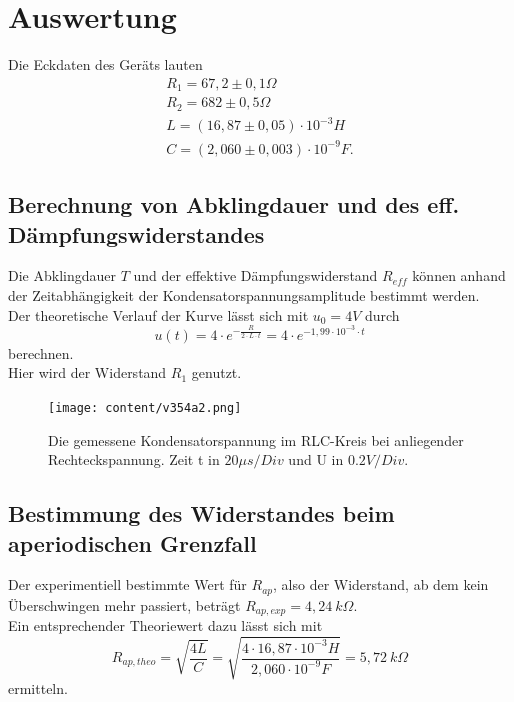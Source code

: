 \section{Auswertung}
\label{sec:Auswertung}

Die Eckdaten des Geräts lauten 
\begin{align*}
  R_1 = 67,2 \pm 0,1 \Omega \\
  R_2 = 682 \pm 0,5 \Omega \\
  L = (16,87 \pm 0,05) \cdot 10^{-3}H \\
  C = (2,060 \pm 0,003) \cdot 10^{-9}F.   %
\end{align*}






\subsection{Berechnung von Abklingdauer und des eff. Dämpfungswiderstandes}
\label{Abklingdauer und R_daempf}

Die Abklingdauer $T$ und der effektive Dämpfungswiderstand $R_{eff}$ können anhand der Zeitabhängigkeit der Kondensatorspannungsamplitude 
bestimmt werden.\\

Der theoretische Verlauf der Kurve lässt sich mit $u_0 = 4V$ durch 
\begin{equation*}
    u(t) = 4 \cdot e^{-\frac{R}{2 \cdot L \cdot t}} = 4 \cdot e^{- 1,99 \cdot 10^{-3} \cdot t}
\end{equation*}
berechnen.\\
Hier wird der Widerstand $R_1$ genutzt. 

\begin{figure}[H]
  \centering
  \texttt{[image: content/v354a2.png]}
  \caption{Die gemessene Kondensatorspannung im RLC-Kreis bei anliegender Rechteckspannung. Zeit t in $20\mu s/Div$ und U in $0.2V/Div$.}
  \label{fig:MessApp}
\end{figure}







\subsection{Bestimmung des Widerstandes beim aperiodischen Grenzfall}
\label{R_ap}

Der experimentiell bestimmte Wert für $R_{ap}$, also der Widerstand, ab dem kein Überschwingen mehr passiert, beträgt $R_{ap,exp} = 4,24 \: k\Omega$. \\
Ein entsprechender Theoriewert dazu lässt sich mit 
\begin{equation*}
  R_{ap,theo} = \sqrt{\frac{4L}{C}} = \sqrt{\frac{4 \cdot 16,87 \cdot 10^{-3}H}{2,060 \cdot 10^{-9}F}} = 5,72 \: k\Omega
\end{equation*}
ermitteln.






